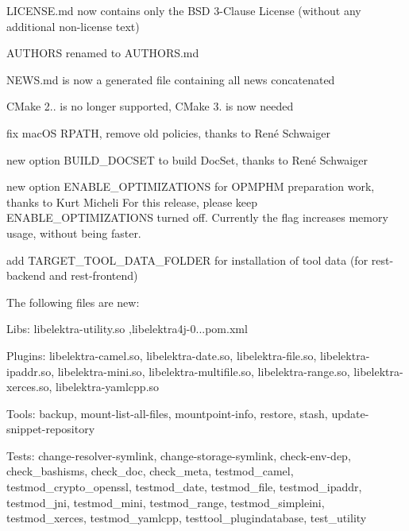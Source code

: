 \begin{DoxyItemize}
\item L\+I\+C\+E\+N\+S\+E.\+md now contains only the B\+SD 3-\/\+Clause License (without any additional non-\/license text)
\item A\+U\+T\+H\+O\+RS renamed to A\+U\+T\+H\+O\+R\+S.\+md
\item N\+E\+W\+S.\+md is now a generated file containing all news concatenated
\item C\+Make 2.. is no longer supported, C\+Make 3. is now needed
\item fix mac\+OS {\ttfamily R\+P\+A\+TH}, remove old policies, thanks to René Schwaiger
\item new option {\ttfamily B\+U\+I\+L\+D\+\_\+\+D\+O\+C\+S\+ET} to build Doc\+Set, thanks to René Schwaiger
\item new option {\ttfamily E\+N\+A\+B\+L\+E\+\_\+\+O\+P\+T\+I\+M\+I\+Z\+A\+T\+I\+O\+NS} for {\ttfamily O\+P\+M\+P\+HM} preparation work, thanks to Kurt Micheli For this release, please keep {\ttfamily E\+N\+A\+B\+L\+E\+\_\+\+O\+P\+T\+I\+M\+I\+Z\+A\+T\+I\+O\+NS} turned off. Currently the flag increases memory usage, without being faster.
\item add {\ttfamily T\+A\+R\+G\+E\+T\+\_\+\+T\+O\+O\+L\+\_\+\+D\+A\+T\+A\+\_\+\+F\+O\+L\+D\+ER} for installation of tool data (for rest-\/backend and rest-\/frontend)
\end{DoxyItemize}

The following files are new\+:


\begin{DoxyItemize}
\item Libs\+: {\ttfamily libelektra-\/utility.\+so} ,{\ttfamily libelektra4j-\/0...\+pom.\+xml}
\item Plugins\+: {\ttfamily libelektra-\/camel.\+so}, {\ttfamily libelektra-\/date.\+so}, {\ttfamily libelektra-\/file.\+so}, {\ttfamily libelektra-\/ipaddr.\+so}, {\ttfamily libelektra-\/mini.\+so}, {\ttfamily libelektra-\/multifile.\+so}, {\ttfamily libelektra-\/range.\+so}, {\ttfamily libelektra-\/xerces.\+so}, {\ttfamily libelektra-\/yamlcpp.\+so}
\item Tools\+: {\ttfamily backup}, {\ttfamily mount-\/list-\/all-\/files}, {\ttfamily mountpoint-\/info}, {\ttfamily restore}, {\ttfamily stash}, {\ttfamily update-\/snippet-\/repository}
\item Tests\+: {\ttfamily change-\/resolver-\/symlink}, {\ttfamily change-\/storage-\/symlink}, {\ttfamily check-\/env-\/dep}, {\ttfamily check\+\_\+bashisms}, {\ttfamily check\+\_\+doc}, {\ttfamily check\+\_\+meta}, {\ttfamily testmod\+\_\+camel}, {\ttfamily testmod\+\_\+crypto\+\_\+openssl}, {\ttfamily testmod\+\_\+date}, {\ttfamily testmod\+\_\+file}, {\ttfamily testmod\+\_\+ipaddr}, {\ttfamily testmod\+\_\+jni}, {\ttfamily testmod\+\_\+mini}, {\ttfamily testmod\+\_\+range}, {\ttfamily testmod\+\_\+simpleini}, {\ttfamily testmod\+\_\+xerces}, {\ttfamily testmod\+\_\+yamlcpp}, {\ttfamily testtool\+\_\+plugindatabase}, {\ttfamily test\+\_\+utility}
\end{DoxyItemize}


